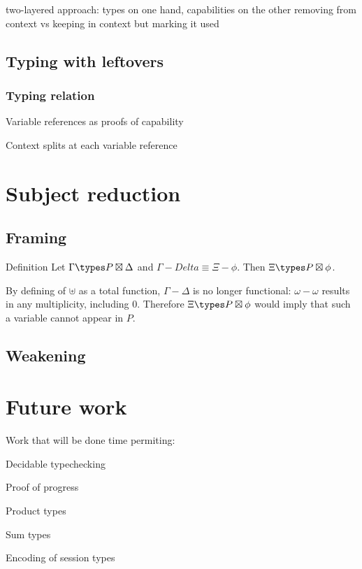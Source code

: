 \documentclass{scrartcl}
\begin{document}
two-layered approach: types on one hand, capabilities on the other
removing from context vs keeping in context but marking it used

\subsection{Typing with leftovers}

\subsubsection{Typing relation}

Variable references as proofs of capability

Context splits at each variable reference

\section{Subject reduction}

\subsection{Framing}

Definition
Let $\Gamma \types P \boxtimes \Delta$ and $\Gamma - Delta \equiv \Xi - \phi$.
Then $\Xi \types P \boxtimes \phi$.

By defining of $\uplus$ as a total function, $\Gamma - \Delta$ is no longer
functional: $\omega - \omega$ results in any multiplicity, including $0$. Therefore
$\Xi \types P \boxtimes \phi$ would imply that such a variable cannot appear in $P$.

\subsection{Weakening}

\section{Future work}

Work that will be done time permiting:

Decidable typechecking

Proof of progress

Product types

Sum types

Encoding of session types


\footnotesize


\end{document}

